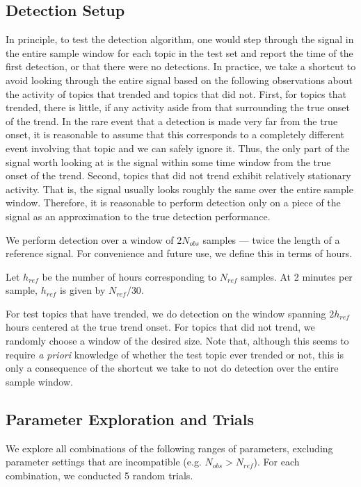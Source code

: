 \subsection{Detection Setup}
In principle, to test the detection algorithm, one would step through the signal
in the entire sample window for each topic in the test set and report the time
of the first detection, or that there were no detections. In practice, we take a
shortcut to avoid looking through the entire signal based on the following
observations about the activity of topics that trended and topics that did
not. First, for topics that trended, there is little, if any activity aside from
that surrounding the true onset of the trend. In the rare event that a detection
is made very far from the true onset, it is reasonable to assume that this
corresponds to a completely different event involving that topic and we can
safely ignore it. Thus, the only part of the signal worth looking at is the
signal within some time window from the true onset of the trend. Second, topics
that did not trend exhibit relatively stationary activity. That is, the signal
usually looks roughly the same over the entire sample window. Therefore, it is
reasonable to perform detection only on a piece of the signal as an
approximation to the true detection performance.

We perform detection over a window of $2N_{obs}$ samples --- twice the length of a
reference signal. For convenience and future use, we define this in terms of hours.

\begin{defn}
Let $h_{ref}$ be the number of hours corresponding to $N_{ref}$ samples. At 2 minutes per sample, $h_{ref}$ is given by $N_{ref} / 30$.
\end{defn}

For test topics that have trended, we do detection on the window spanning
$2h_{ref}$ hours centered at the true trend onset. For topics that did not
trend, we randomly choose a window of the desired size. Note that, although this
seems to require {\em a priori} knowledge of whether the test topic ever trended
or not, this is only a consequence of the shortcut we take to not do detection
over the entire sample window.

\subsection{Parameter Exploration and Trials}
We explore all combinations of the following ranges of parameters, excluding
parameter settings that are incompatible (e.g. $N_{obs} > N_{ref}$). For each
combination, we conducted 5 random trials.

